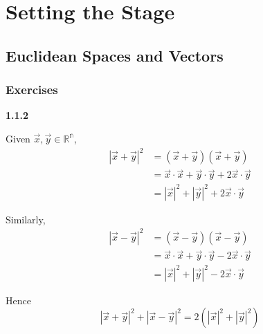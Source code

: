 \section{Setting the Stage}

\subsection{Euclidean Spaces and Vectors}

\subsubsection{Exercises}

\textbf{1.1.2}

Given $\vec{x}, \vec{y} \in \mathbb{R^n}$,
\begin{align*}
|\vec{x} + \vec{y} |^2 &= (\vec{x} +\vec{y}) (\vec{x} +\vec{y}) \\
&= \vec{x}\cdot\vec{x} + \vec{y}\cdot\vec{y} + 2\vec{x}\cdot\vec{y} \\
&= |\vec{x}|^2 + |\vec{y}|^2 + 2\vec{x}\cdot\vec{y}
\end{align*}

Similarly,
\begin{align*}
|\vec{x} - \vec{y} |^2 &= (\vec{x} - \vec{y}) (\vec{x} - \vec{y}) \\
    &= \vec{x}\cdot\vec{x} + \vec{y}\cdot\vec{y} - 2\vec{x}\cdot\vec{y} \\
    &= |\vec{x}|^2 + |\vec{y}|^2 - 2\vec{x}\cdot\vec{y}
\end{align*}

Hence
$$
|\vec{x} + \vec{y} |^2 + |\vec{x} - \vec{y} |^2 = 2\left( |\vec{x}|^2 + |\vec{y}|^2 \right)
$$